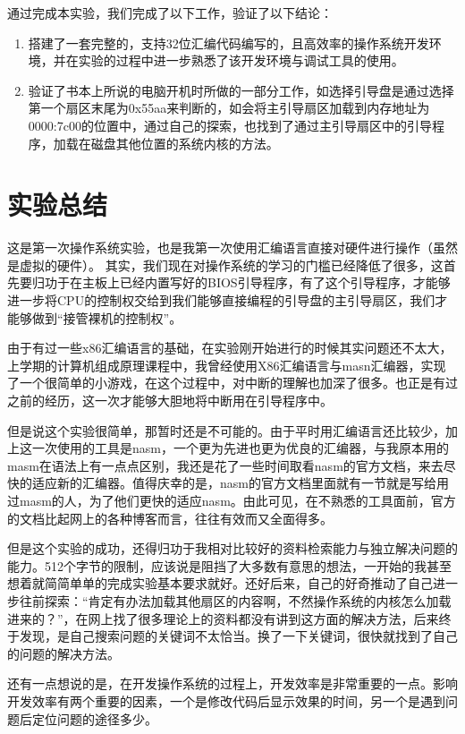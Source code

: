 \documentclass[forprint]{WHUBachelor}
\begin{document}
通过完成本实验，我们完成了以下工作，验证了以下结论：

\begin{enumerate}
  \item 搭建了一套完整的，支持32位汇编代码编写的，且高效率的操作系统开发环境，并在实验的过程中进一步熟悉了该开发环境与调试工具的使用。
  \item 验证了书本上所说的电脑开机时所做的一部分工作，如选择引导盘是通过选择第一个扇区末尾为0x55aa来判断的，如会将主引导扇区加载到内存地址为0000:7c00的位置中，通过自己的探索，也找到了通过主引导扇区中的引导程序，加载在磁盘其他位置的系统内核的方法。
\end{enumerate}

\chapter{实验总结}

这是第一次操作系统实验，也是我第一次使用汇编语言直接对硬件进行操作（虽然是虚拟的硬件）。
其实，我们现在对操作系统的学习的门槛已经降低了很多，这首先要归功于在主板上已经内置写好的BIOS引导程序，有了这个引导程序，才能够进一步将CPU的控制权交给到我们能够直接编程的引导盘的主引导扇区，我们才能够做到“接管裸机的控制权”。

由于有过一些x86汇编语言的基础，在实验刚开始进行的时候其实问题还不太大，上学期的计算机组成原理课程中，我曾经使用X86汇编语言与masn汇编器，实现了一个很简单的小游戏，在这个过程中，对中断的理解也加深了很多。也正是有过之前的经历，这一次才能够大胆地将中断用在引导程序中。

但是说这个实验很简单，那暂时还是不可能的。由于平时用汇编语言还比较少，加上这一次使用的工具是nasm，一个更为先进也更为优良的汇编器，与我原本用的masm在语法上有一点点区别，我还是花了一些时间取看nasm的官方文档，来去尽快的适应新的汇编器。值得庆幸的是，nasm的官方文档里面就有一节就是写给用过masm的人，为了他们更快的适应nasm。由此可见，在不熟悉的工具面前，官方的文档比起网上的各种博客而言，往往有效而又全面得多。

但是这个实验的成功，还得归功于我相对比较好的资料检索能力与独立解决问题的能力。512个字节的限制，应该说是阻挡了大多数有意思的想法，一开始的我甚至想着就简简单单的完成实验基本要求就好。还好后来，自己的好奇推动了自己进一步往前探索：“肯定有办法加载其他扇区的内容啊，不然操作系统的内核怎么加载进来的？”，在网上找了很多理论上的资料都没有讲到这方面的解决方法，后来终于发现，是自己搜索问题的关键词不太恰当。换了一下关键词，很快就找到了自己的问题的解决方法。

还有一点想说的是，在开发操作系统的过程上，开发效率是非常重要的一点。影响开发效率有两个重要的因素，一个是修改代码后显示效果的时间，另一个是遇到问题后定位问题的途径多少。
\end{document}
